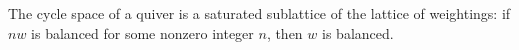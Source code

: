 \begin{lemma}\label{Arden24-lem-2.2}
\label{Arden24-lem:saturated}
The cycle space of a quiver is a saturated sublattice of the lattice of weightings: if $nw$ is balanced for some nonzero integer $n$, then $w$ is balanced.
\end{lemma}